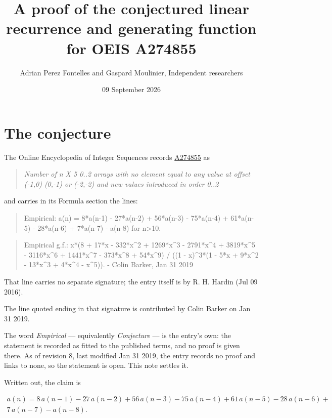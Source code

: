 \documentclass[11pt]{article}
\title{A proof of the conjectured linear recurrence and generating function for OEIS A274855}
\author{Adrian Perez Fontelles and Gaspard Moulinier, Independent researchers}
\date{09 September 2026}
\theoremstyle{definition}
\begin{document}
\maketitle
\section{The conjecture}

The Online Encyclopedia of Integer Sequences records \href{https://oeis.org/A274855}{A274855} as

\begin{quote}\itshape Number of n X 5 0..2 arrays with no element equal to any value at offset (-1,0) (0,-1) or (-2,-2) and new values introduced in order 0..2\end{quote}

and carries in its Formula section the lines:

\begin{quote}\ttfamily Empirical: a(n) = 8*a(n-1) - 27*a(n-2) + 56*a(n-3) - 75*a(n-4) + 61*a(n-5) - 28*a(n-6) + 7*a(n-7) - a(n-8) for n>10.\end{quote}

\begin{quote}\ttfamily Empirical g.f.: x*(8 + 17*x - 332*x\textasciicircum{}2 + 1269*x\textasciicircum{}3 - 2791*x\textasciicircum{}4 + 3819*x\textasciicircum{}5 - 3116*x\textasciicircum{}6 + 1441*x\textasciicircum{}7 - 373*x\textasciicircum{}8 + 54*x\textasciicircum{}9) / ((1 - x)\textasciicircum{}3*(1 - 5*x + 9*x\textasciicircum{}2 - 13*x\textasciicircum{}3 + 4*x\textasciicircum{}4 - x\textasciicircum{}5)). - Colin Barker, Jan 31 2019\end{quote}

That line carries no separate signature; the entry itself is by R. H. Hardin (Jul 09 2016).

The line quoted ending in that signature is contributed by Colin Barker on Jan 31 2019.

The word {\itshape Empirical} --- equivalently {\itshape Conjecture} --- is the entry's own: the statement is recorded as fitted to the published terms, and no proof is given there. As of revision 8, last modified Jan 31 2019, the entry records no proof and links to none, so the statement is open. This note settles it.

Written out, the claim is

\begin{multline*} a(n) = 8\,a(n-1) - 27\,a(n-2) + 56\,a(n-3) - 75\,a(n-4) + 61\,a(n-5) - 28\,a(n-6) + \\ 7\,a(n-7) - a(n-8). \end{multline*}
\end{document}
